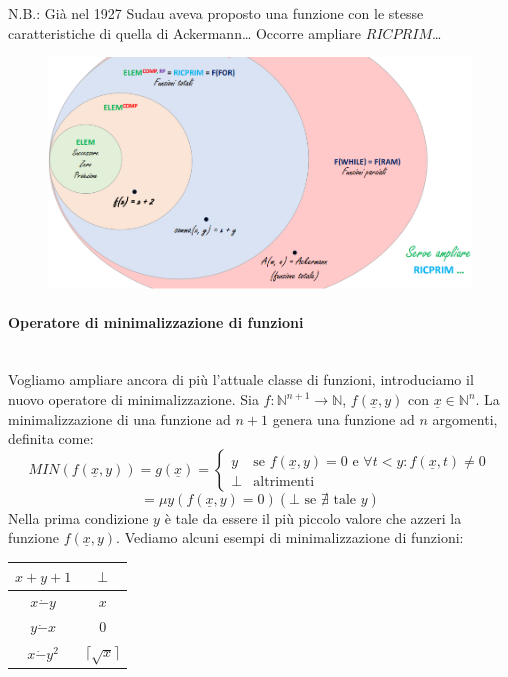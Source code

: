 \documentclass{article}
\begin{document}
N.B.: Già nel 1927 Sudau aveva proposto una funzione con le stesse caratteristiche
di quella di Ackermann\dots
Occorre ampliare $RICPRIM$\dots
\begin{figure}[H]
    \centering
    \includegraphics[scale=0.5]{images/classi_funzioni.png}
\end{figure}

\paragraph{Operatore di minimalizzazione di funzioni}\mbox{}\\
Vogliamo ampliare ancora di più l'attuale classe di funzioni, introduciamo il nuovo operatore
di minimalizzazione.
Sia $f:\mathbb{N}^{n+1}\rightarrow\mathbb{N}$, $f(\underline{x},y)$ con
$\underline{x}\in\mathbb{N}^n$. La minimalizzazione di una funzione ad $n+1$ genera una
funzione ad $n$ argomenti, definita come:
\[
    MIN(f(\underline{x},y))=g(\underline{x})=
    \begin{cases}
        y    & \text{se }f(\underline{x},y)=0\text{ e }\forall t<y:f(\underline{x},t)\neq 0 \\
        \bot & \text{altrimenti}
    \end{cases}
\]
$$= \mu y(f(\underline{x},y)=0) (\bot\text{ se }\nexists \text{ tale }y)$$
Nella prima condizione $y$ è tale da essere il più piccolo valore
che azzeri la funzione $f(\underline{x},y)$. Vediamo alcuni esempi di minimalizzazione
di funzioni:
\begin{center}
    \begin{tabular}{c|c}
        \toprule
        $x+y+1$       & $\bot$                 \\
        \midrule
        $x\dot{-}y$   & $x$                    \\
        \midrule
        $y\dot{-}x$   & $0$                    \\
        \midrule
        $x\dot{-}y^2$ & $\lceil\sqrt{x}\rceil$ \\
        \bottomrule
    \end{tabular}
\end{center}
\end{document}
